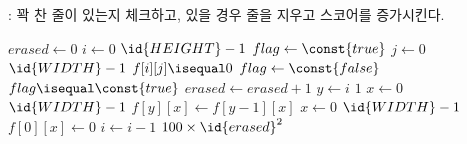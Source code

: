 \newpage

\subsubsection{}: 꽉 찬 줄이 있는지 체크하고, 있을 경우 줄을 지우고 스코어를 증가시킨다.

\begin{codebox}
\li $erased \gets 0$
\li \For $i \gets 0$ \To $\id{HEIGHT} - 1$
\li \Do
        $flag \gets \const{true}$
\li     \For $j \gets 0$ \To $\id{WIDTH} - 1$
\li     \Do
            \If $f[i][j] \isequal 0$
\li         \Then
                $flag \gets \const{false}$
            \End
        \End
\li     \If $flag \isequal \const{true}$
            \Then
\li             $erased \gets erased + 1$
\li             \For $y \gets i$ \Downto $1$
\li             \Do
                    \For $x \gets 0$ \To $\id{WIDTH} - 1$
\li                 \Do
                        $f[y][x] \gets f[y - 1][x]$
                    \End
                \End
\li             \For $x \gets 0$ \To $\id{WIDTH} - 1$
\li             \Do
                    $f[0][x] \gets 0$
                \End
\li             $i \gets i - 1$
            \End
        \End
    \End
\li \Return $100 \times \id{erased}^2$
\end{codebox}


